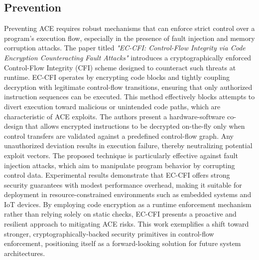 \documentclass[a4paper]{usiinfbachelorproject}
\begin{document}
\subsection{Prevention}
\label{sec:current_studies}

Preventing ACE requires robust mechanisms that can enforce strict control over a program’s execution flow, especially in the presence of fault injection and memory corruption attacks. The paper titled \textit{"EC-CFI: Control-Flow Integrity via Code Encryption Counteracting Fault Attacks"} introduces a cryptographically enforced Control-Flow Integrity (CFI) scheme designed to counteract such threats at runtime. EC-CFI operates by encrypting code blocks and tightly coupling decryption with legitimate control-flow transitions, ensuring that only authorized instruction sequences can be executed. This method effectively blocks attempts to divert execution toward malicious or unintended code paths, which are characteristic of ACE exploits. The authors present a hardware-software co-design that allows encrypted instructions to be decrypted on-the-fly only when control transfers are validated against a predefined control-flow graph. Any unauthorized deviation results in execution failure, thereby neutralizing potential exploit vectors. The proposed technique is particularly effective against fault injection attacks, which aim to manipulate program behavior by corrupting control data. Experimental results demonstrate that EC-CFI offers strong security guarantees with modest performance overhead, making it suitable for deployment in resource-constrained environments such as embedded systems and IoT devices. By employing code encryption as a runtime enforcement mechanism rather than relying solely on static checks, EC-CFI presents a proactive and resilient approach to mitigating ACE risks. This work exemplifies a shift toward stronger, cryptographically-backed security primitives in control-flow enforcement, positioning itself as a forward-looking solution for future system architectures.
\end{document}
